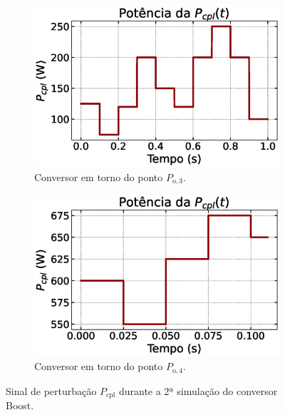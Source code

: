 \begin{figure}[ht]
  \centering
  \captionsetup{justification=centering}
  \begin{subfigure}{.5\textwidth}
    \centering
    \captionsetup{justification=centering}
    \includegraphics[width=1.\textwidth]{figuras/boost/sim2/op1/power_cpl_variation.eps}
    \caption{Conversor em torno do ponto $P_{\mathrm{o}, 3}$.}
    \label{fig:boost_power_cpl_variation_1}
  \end{subfigure}%
  \begin{subfigure}{.5\textwidth}
    \centering
    \captionsetup{justification=centering}
    \includegraphics[width=1.\textwidth]{figuras/boost/sim2/op2/power_cpl_variation.eps}
    \caption{Conversor em torno do ponto $P_{\mathrm{o}, 4}$.}
    \label{fig:boost_power_cpl_variation_2}
  \end{subfigure}
  \caption{Sinal de perturbação $P_{\mathrm{cpl}}$ durante a 2ª simulação do conversor Boost.}
  \label{fig:boost_power_cpl_variation}
\end{figure}

